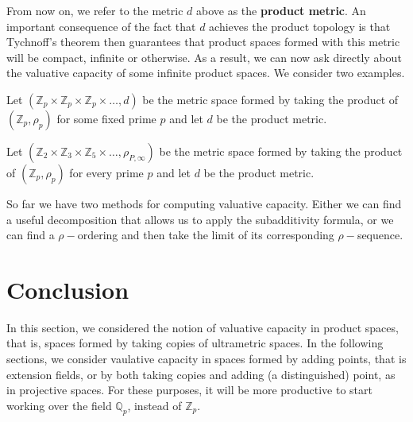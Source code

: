 From now on, we refer to the metric $d$ above as the \textbf{product metric}. An important consequence of the fact that $d$ achieves the product topology is that Tychnoff's theorem then guarantees that product spaces formed with this metric will be compact, infinite or otherwise. As a result, we can now ask directly about the valuative capacity of some infinite product spaces. We consider two examples. 

\begin{example}
	Let $(\mathbb{Z}_p \times \mathbb{Z}_p \times \mathbb{Z}_p \times \ldots, d)$ be the metric space formed by taking the product of $(\mathbb{Z}_p, \rho_p)$ for some fixed prime $p$ and let $d$ be the product metric.
\end{example}

\begin{example}
	Let $(\mathbb{Z}_2 \times \mathbb{Z}_3 \times \mathbb{Z}_5 \times \ldots, \rho_{P,\infty})$ be the metric space formed by taking the product of $(\mathbb{Z}_p, \rho_p)$ for every prime $p$ and let $d$ be the product metric.
\end{example}

So far we have two methods for computing valuative capacity. Either we can find a useful decomposition that allows us to apply the subadditivity formula, or we can find a $\rho-$ordering and then take the limit of its corresponding $\rho-$sequence.


\section*{Conclusion}
In this section, we considered the notion of valuative capacity in product spaces, that is, spaces formed by taking copies of ultrametric spaces. In the following sections, we consider  vaulative capacity in spaces formed by adding points, that is extension fields, or by both taking copies and adding (a distinguished) point, as in projective spaces. For these purposes, it will be more productive to start working over the field $\mathbb{Q}_p$, instead of $\mathbb{Z}_p$.




































